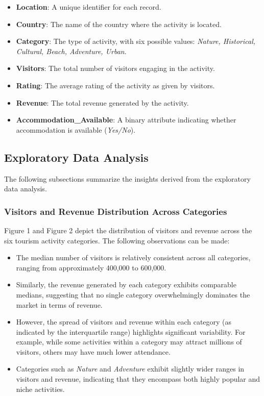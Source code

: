 \documentclass{article}
\begin{document}
\begin{itemize}
    \item \textbf{Location}: A unique identifier for each record.
    \item \textbf{Country}: The name of the country where the activity is located.
    \item \textbf{Category}: The type of activity, with six possible values:
          \textit{Nature, Historical, Cultural, Beach, Adventure, Urban}.
    \item \textbf{Visitors}: The total number of visitors engaging in the activity.
    \item \textbf{Rating}: The average rating of the activity as given by visitors.
    \item \textbf{Revenue}: The total revenue generated by the activity.
    \item \textbf{Accommodation\_Available}: A binary attribute indicating whether accommodation is
          available (\textit{Yes/No}).
\end{itemize}

\subsection{Exploratory Data Analysis}

The following subsections summarize the insights derived from the exploratory data analysis.

\subsubsection{Visitors and Revenue Distribution Across Categories}

Figure 1 and Figure 2 depict the distribution of visitors and revenue across the six tourism activity categories. The following observations can be made:
\begin{itemize}
    \item The median number of visitors is relatively consistent across all categories, ranging from approximately 400,000 to 600,000.
    \item Similarly, the revenue generated by each category exhibits comparable medians, suggesting that no single category overwhelmingly dominates the market in terms of revenue.
    \item However, the spread of visitors and revenue within each category (as indicated by the interquartile range) highlights significant variability. For example, while some activities within a category may attract millions of visitors, others may have much lower attendance.
    \item Categories such as \textit{Nature} and \textit{Adventure} exhibit slightly wider ranges in visitors and revenue, indicating that they encompass both highly popular and niche activities.
\end{itemize}
\end{document}
